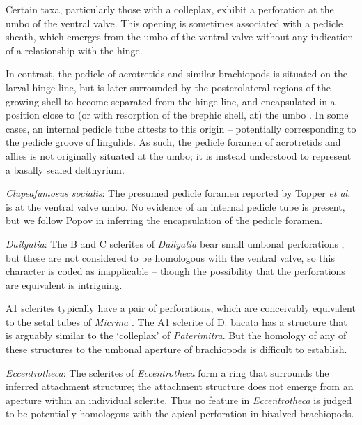 \documentclass[openany]{book}
\theoremstyle{definition}
\theoremstyle{definition}
\theoremstyle{definition}
\theoremstyle{remark}
\begin{document}
Certain taxa, particularly those with a colleplax, exhibit a perforation
at the umbo of the ventral valve. This opening is sometimes associated
with a pedicle sheath, which emerges from the umbo of the ventral valve
without any indication of a relationship with the hinge.

In contrast, the pedicle of acrotretids and similar brachiopods is
situated on the larval hinge line, but is later surrounded by the
posterolateral regions of the growing shell to become separated from the
hinge line, and encapsulated in a position close to (or with resorption
of the brephic shell, at) the umbo \citep[see][pp.~407--411 and fig. 3
for discussion]{Popov1992TheCambrian}. In some cases, an internal
pedicle tube attests to this origin -- potentially corresponding to the
pedicle groove of lingulids. As such, the pedicle foramen of acrotretids
and allies is not originally situated at the umbo; it is instead
understood to represent a basally sealed delthyrium.

\hypertarget{Clupeafumosus_socialis-coding-101}{}
\emph{Clupeafumosus socialis}: The presumed pedicle foramen reported by
Topper \emph{et al}. \citeyearpar{Topper2013Reappraisalof} is at the
ventral valve umbo. No evidence of an internal pedicle tube is present,
but we follow Popov \citeyearpar{Popov1992TheCambrian} in inferring the
encapsulation of the pedicle foramen.

\hypertarget{Dailyatia-coding-101}{}
\emph{Dailyatia}: The B and C sclerites of \emph{Dailyatia} bear small
umbonal perforations \citep{Skovsted2015Theearly}, but these are not
considered to be homologous with the ventral valve, so this character is
coded as inapplicable -- though the possibility that the perforations
are equivalent is intriguing.

A1 sclerites typically have a pair of perforations, which are
conceivably equivalent to the setal tubes of \emph{Micrina}
\citep{Holmer2011Firstrecord}. The A1 sclerite of D. bacata has a
structure that is arguably similar to the `colleplax' of
\emph{Paterimitra}. But the homology of any of these structures to the
umbonal aperture of brachiopods is difficult to establish.

\hypertarget{Eccentrotheca-coding-101}{}
\emph{Eccentrotheca}: The sclerites of \emph{Eccentrotheca} form a ring
that surrounds the inferred attachment structure; the attachment
structure does not emerge from an aperture within an individual
sclerite. Thus no feature in \emph{Eccentrotheca} is judged to be
potentially homologous with the apical perforation in bivalved
brachiopods.
\end{document}
